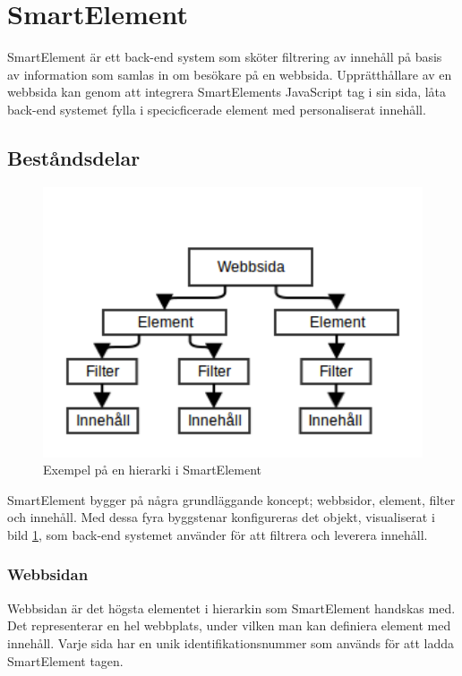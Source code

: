 \section{SmartElement}

SmartElement är ett back-end system som sköter filtrering av innehåll på basis av information som samlas in om besökare på en webbsida. Upprätthållare av en webbsida kan genom att integrera SmartElements JavaScript tag i sin sida, låta back-end systemet fylla i specicficerade element med personaliserat innehåll.

\subsection{Beståndsdelar}

\begin{figure}[h!]
\centering
\includegraphics[width=120mm]{assets/images/smelementdatamodelabstract.png}
\caption{Exempel på en hierarki i SmartElement}
\label{abstractstructure}
\end{figure}

SmartElement bygger på några grundläggande koncept; webbsidor, element, filter och innehåll. Med dessa fyra byggstenar konfigureras det objekt, visualiserat i bild \ref{abstractstructure}, som back-end systemet använder för att filtrera och leverera innehåll.

\subsubsection{Webbsidan}

Webbsidan är det högsta elementet i hierarkin som SmartElement handskas med. Det representerar en hel webbplats, under vilken man kan definiera element med innehåll. Varje sida har en unik identifikationsnummer som används för att ladda SmartElement tagen.

